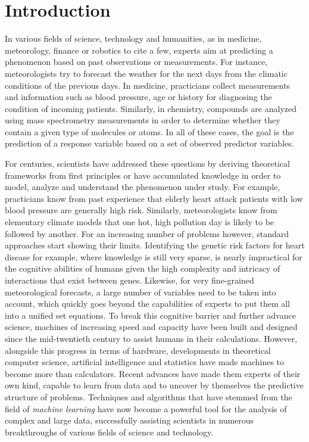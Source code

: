 \chapter{Introduction}\label{ch:introduction}

In various fields of science, technology and humanities, as in medicine,
meteorology, finance or robotics to cite a few, experts aim at predicting a
phenomenon based on past observations or measurements. For instance,
meteorologists try to forecast the weather for the next days from the climatic
conditions of the previous days. In medicine, practicians collect measurements
and information such as blood pressure, age or history for diagnosing the
condition of incoming patients. Similarly, in chemistry, compounds are analyzed
using mass spectrometry measurements in order to determine whether they contain
a given type of molecules or atoms. In all of these cases, the goal is
the prediction of a response variable based on a set of observed predictor
variables.

For centuries, scientists have addressed these questions by deriving
theoretical frameworks from first principles or have accumulated knowledge in
order to model, analyze and understand the pheno\-menon under study. For
example, practicians know from past experience that elderly heart attack
patients with low blood pressure are generally high risk. Similarly,
meteorologists know from elementary climate models that one hot, high pollution
day is likely to be followed by another. For an increasing number of problems
however, standard approaches start showing their limits. Identifying the
genetic risk factors for heart disease for example, where knowledge is still
very sparse, is nearly impractical for the cognitive abilities of humans given
the high complexity and intricacy of interactions that exist between genes.
Likewise, for very fine-grained meteorological forecasts, a large number of
variables need to be taken into account, which quickly goes beyond the
capabilities of experts to put them all into a unified set equations. To break
this cognitive barrier and further advance science, machines of increasing
speed and capacity have been built and designed since the mid-twentieth century
to assist humans in their calculations. However, alongside this progress in
terms of hardware, developments in theoretical computer science, artificial
intelligence and statistics have made machines to become more than calculators.
Recent advances have made them experts of their own kind, capable to learn from
data and to uncover by themselves the predictive structure of problems.
Techniques and algorithms that have stemmed from the field of {\it machine
learning} have now become a powerful tool for the analysis of complex and large
data, successfully assisting scientists in numerous breakthroughs of various
fields of science and technology.

